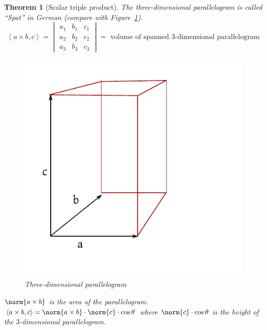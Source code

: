 \documentclass[a4paper,landscape,twocolumn]{article}
\newcommand\functional[1]{\left\langle{#1}\right\rangle}
\newtheorem{theorem}{Theorem}
\DeclarePairedDelimiter\norm\lVert\rVert
\begin{document}
\begin{theorem}[Scalar triple product]
  \label{satz-8.11}
  The three-dimensional parallelogram is called \enquote{Spat} in German (compare with Figure~\ref{img:3dp}).
  \[
    \functional{a\times b, c}
    = \begin{vmatrix}
      a_1 & b_1 & c_1 \\
      a_2 & b_2 & c_2 \\
      a_3 & b_3 & c_3
    \end{vmatrix}
    = \text{ volume of spanned 3-dimensional parallelogram}
  \]
  \begin{figure}[!h]
    \begin{center}
      \includegraphics{img/scalar-triple-product.pdf}
      \caption{Three-dimensional parallelogram}
      \label{img:3dp}
    \end{center}
  \end{figure}
  $\norm{a \times b}$ is the area of the parallelogram.
  $\functional{a \times b, c} = \norm{a \times b} \cdot \norm{c} \cdot \cos\theta$
  where $\norm{c} \cdot \cos\theta$ is the height of the $3$-dimensional parallelogram.


\end{theorem}
\end{document}
